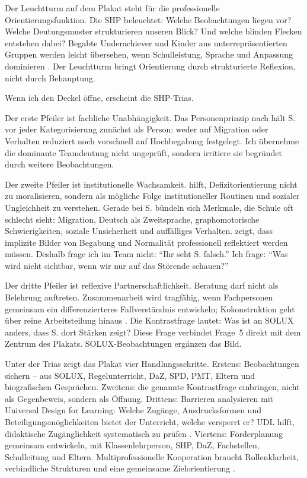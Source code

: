 \documentclass[ngerman, a4paper]{article}
\begin{document}
Der Leuchtturm auf dem Plakat steht für die professionelle Orientierungsfunktion.
Die SHP beleuchtet: Welche Beobachtungen liegen vor? Welche Deutungsmuster
strukturieren unseren Blick? Und welche blinden Flecken entstehen dabei? Begabte
Underachiever und Kinder aus unterrepräsentierten Gruppen werden leicht
übersehen, wenn Schulleistung, Sprache und Anpassung dominieren
\parencite{baudson2025besserfinden}. Der Leuchtturm bringt Orientierung durch
strukturierte Reflexion, nicht durch Behauptung.

Wenn ich den Deckel öffne, erscheint die SHP-Trias.

Der erste Pfeiler ist fachliche Unabhängigkeit. Das Personenprinzip nach
\textcite{weigand2021person} hält S. vor jeder Kategorisierung zunächst als
Person: weder auf Migration oder Verhalten reduziert noch vorschnell auf
Hochbegabung festgelegt. Ich übernehme die dominante Teamdeutung nicht
ungeprüft, sondern irritiere sie begründet durch weitere Beobachtungen.

Der zweite Pfeiler ist institutionelle Wachsamkeit.
\textcite{horvath2021elite} hilft, Defizitorientierung nicht zu moralisieren,
sondern als mögliche Folge institutioneller Routinen und sozialer Ungleichheit
zu verstehen. Gerade bei S. bündeln sich Merkmale, die Schule oft schlecht
sieht: Migration, Deutsch als Zweitsprache, graphomotorische Schwierigkeiten,
soziale Unsicherheit und auffälliges Verhalten.
\textcite{macha2019gender} zeigt, dass implizite Bilder von Begabung und
Normalität professionell reflektiert werden müssen. Deshalb frage ich im Team
nicht: \enquote{Ihr seht S. falsch.} Ich frage: \enquote{Was wird nicht
sichtbar, wenn wir nur auf das Störende schauen?}

Der dritte Pfeiler ist reflexive Partnerschaftlichkeit. Beratung darf nicht als
Belehrung auftreten. Zusammenarbeit wird tragfähig, wenn Fachpersonen gemeinsam
ein differenzierteres Fallverständnis entwickeln; Kokonstruktion geht über reine
Arbeitsteilung hinaus \parencite{groschefussangelgraesel2020kokonstruktion}. Die
Kontrastfrage lautet: Was ist an SOLUX anders, dass S. dort Stärken zeigt? Diese
Frage verbindet Frage~5 direkt mit dem Zentrum des Plakats.
SOLUX-Beobachtungen ergänzen das Bild.

Unter der Trias zeigt das Plakat vier Handlungsschritte. Erstens: Beobachtungen
sichern -- aus SOLUX, Regelunterricht, DaZ, SPD, PMT, Eltern und biografischen
Gesprächen. Zweitens: die genannte Kontrastfrage einbringen, nicht als
Gegenbeweis, sondern als Öffnung. Drittens: Barrieren analysieren mit Universal
Design for Learning: Welche Zugänge, Ausdrucksformen und Beteiligungsmöglichkeiten
bietet der Unterricht, welche versperrt er? UDL hilft, didaktische
Zugänglichkeit systematisch zu prüfen
\parencite{muellerboeschschaffnermenn2021udl}. Viertens: Förderplanung gemeinsam
entwickeln, mit Klassenlehrperson, SHP, DaZ, Fachstellen, Schulleitung und
Eltern. Multiprofessionelle Kooperation braucht Rollenklarheit, verbindliche
Strukturen und eine gemeinsame Zielorientierung
\parencites{widmerwolf2018multiprofessionell}{nguyensliwka2021massnahmen}.
\end{document}
